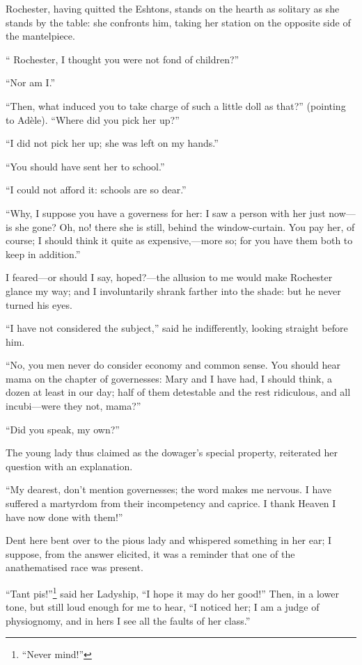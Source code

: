 \Mr{} Rochester, having quitted the Eshtons, stands on the hearth as
solitary as she stands by the table: she confronts him, taking her
station on the opposite side of the mantelpiece.

\enquote{\Mr{} Rochester, I thought you were not fond of children?}

\enquote{Nor am I\@.}

\enquote{Then, what induced you to take charge of such a little doll as
that?} (pointing to Adèle). \enquote{Where did you pick her up?}

\enquote{I did not pick her up; she was left on my hands.}

\enquote{You should have sent her to school.}

\enquote{I could not afford it: schools are so dear.}

\enquote{Why, I suppose you have a governess for her: I saw a person
with her just now---is she gone? Oh, no! there she is still, behind the
window-curtain. You pay her, of course; I should think it quite as
expensive,---more so; for you have them both to keep in addition.}

I feared---or should I say, hoped?---the allusion to me would make \Mr{}
 Rochester glance my way; and I involuntarily shrank farther into the
shade: but he never turned his eyes.

\enquote{I have not considered the subject,} said he indifferently,
looking straight before him.

\enquote{No, you men never do consider economy and common sense. You
should hear mama on the chapter of governesses: Mary and I have had, I
should think, a dozen at least in our day; half of them detestable and
the rest ridiculous, and all incubi---were they not, mama?}

\enquote{Did you speak, my own?}

The young lady thus claimed as the dowager's special property,
reiterated her question with an explanation.

\enquote{My dearest, don't mention governesses; the word makes me
nervous. I have suffered a martyrdom from their incompetency and
caprice. I thank Heaven I have now done with them!}

\Mrs{} Dent here bent over to the pious lady and whispered something in
her ear; I suppose, from the answer elicited, it was a reminder that one
of the anathematised race was present.

\foreignquote{french}{Tant pis!}\footnote{\enquote{Never mind!}} said her Ladyship, \enquote{I hope it may do her
good!} Then, in a lower tone, but still loud enough for me to hear,
\enquote{I noticed her; I am a judge of physiognomy, and in hers I see
all the faults of her class.}

